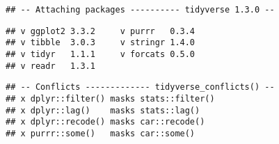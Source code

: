 \documentclass[
]{article}
\begin{document}
\begin{verbatim}
## -- Attaching packages ---------- tidyverse 1.3.0 --
\end{verbatim}

\begin{verbatim}
## v ggplot2 3.3.2     v purrr   0.3.4
## v tibble  3.0.3     v stringr 1.4.0
## v tidyr   1.1.1     v forcats 0.5.0
## v readr   1.3.1
\end{verbatim}

\begin{verbatim}
## -- Conflicts ------------- tidyverse_conflicts() --
## x dplyr::filter() masks stats::filter()
## x dplyr::lag()    masks stats::lag()
## x dplyr::recode() masks car::recode()
## x purrr::some()   masks car::some()
\end{verbatim}
\end{document}
